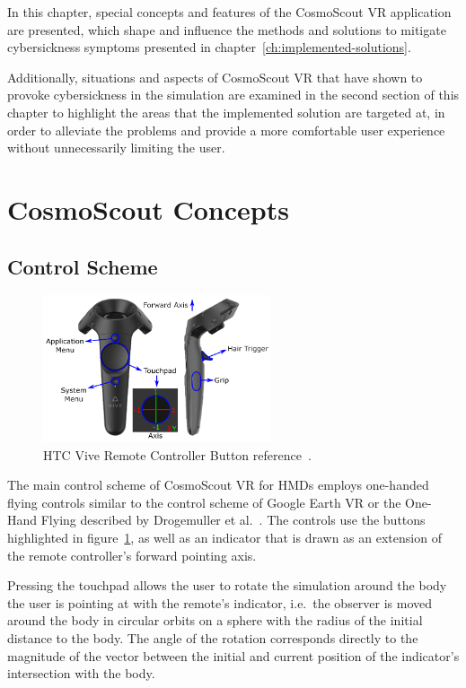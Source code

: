 In this chapter, special concepts and features of the CosmoScout VR application are presented, which shape and
influence the methods and solutions to mitigate cybersickness symptoms presented in
chapter~\ref{ch:implemented-solutions}.

Additionally, situations and aspects of CosmoScout VR that have shown to provoke cybersickness in the simulation are
examined in the second section of this chapter to highlight the areas that the implemented solution are targeted at,
in order to alleviate the problems and provide a more comfortable user experience without unnecessarily limiting the
user.

\section{CosmoScout Concepts}\label{sec:cosmoscout-concepts}
\subsection{Control Scheme}\label{subsec:control-scheme}

\begin{figure}[h]
    \centering
    \includegraphics[width=0.6\textwidth]{content/3_current_state/img/ViveControllerButtons[BAA2017]}
    \caption{HTC Vive Remote Controller Button reference~\cite{BAA2017}.}
    \label{fig:controller-reference}
\end{figure}

The main control scheme of CosmoScout VR for HMDs employs one-handed flying controls similar to the control
scheme of Google Earth VR or the One-Hand Flying described by Drogemuller et al.~\cite{Drogemuller2020}.
The controls use the buttons highlighted in figure~\ref{fig:controller-reference}, as well as an indicator that is
drawn as an extension of the remote controller's forward pointing axis.

Pressing the touchpad allows the user to rotate the simulation around the body the user is pointing at with the
remote's indicator, i.e.\ the observer is moved around the body in circular orbits on a sphere with the radius of the
initial distance to the body.
The angle of the rotation corresponds directly to the magnitude of the vector between the initial and current position
of the indicator's intersection with the body.

